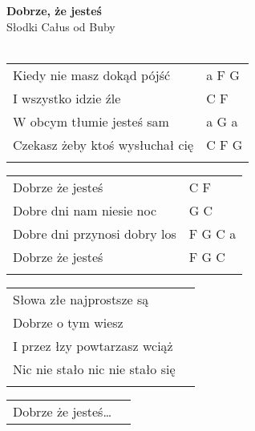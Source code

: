 \documentclass[a5paper]{article}
\begin{document}


\noindent
\fontsize{12pt}{15pt}\selectfont
\textbf{Dobrze, że jesteś} \\
\fontsize{8pt}{10pt}\selectfont
Słodki Całus od Buby \\ \\
\fontsize{10pt}{12pt}\selectfont
{}
\begin{tabular}{@{}p{8.00cm}p{3cm}@{}}
\noindent
Kiedy nie masz dokąd pójść & a F G \\
I wszystko idzie źle & C F \\
W obcym tłumie jesteś sam & a G a \\
Czekasz żeby ktoś wysłuchał cię & C F G \\ \\
\end{tabular}

\noindent
\begin{tabular}{@{}p{7.00cm}p{3cm}@{}}
Dobrze że jesteś & C F \\
Dobre dni nam niesie noc & G C \\
Dobre dni przynosi dobry los & F G C a \\
Dobrze że jesteś & F G C \\ \\
\end{tabular}

\noindent
\begin{tabular}{@{}p{7.00cm}p{3cm}@{}}
Słowa złe najprostsze są \\
Dobrze o tym wiesz \\
I przez łzy powtarzasz wciąż \\
Nic nie stało nic nie stało się \\ \\
\end{tabular}

\noindent
\begin{tabular}{@{}p{7.00cm}p{3cm}@{}}
Dobrze że jesteś…
\end{tabular}
\end{document}
